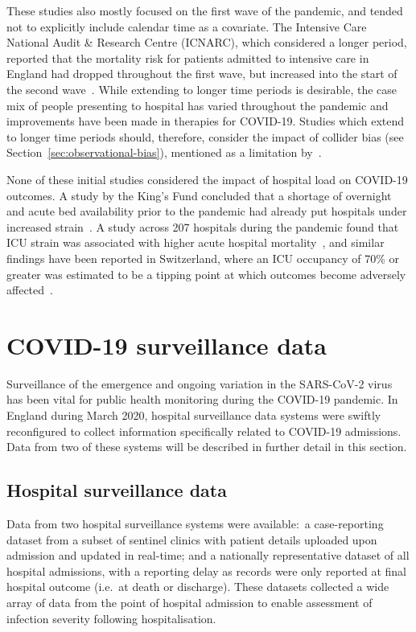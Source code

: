 These studies also mostly focused on the first wave of the pandemic, and tended not to explicitly include calendar time as a covariate. The Intensive Care National Audit \& Research Centre (ICNARC), which considered a longer period, reported that the mortality risk for patients admitted to intensive care in England had dropped throughout the first wave, but increased into the start of the second wave~\parencite{Intensive-Care-National-Audit-and-Research-Centre2021-vs}. While extending to longer time periods is desirable, the case mix of people presenting to hospital has varied throughout the pandemic and improvements have been made in therapies for COVID-19. Studies which extend to longer time periods should, therefore, consider the impact of collider bias (see Section~\ref{sec:observational-bias}), mentioned as a limitation by~\cite{Gray2021-xk}.

None of these initial studies considered the impact of hospital load on COVID-19 outcomes. A study by the King’s Fund concluded that a shortage of overnight and acute bed availability prior to the pandemic had already put hospitals under increased strain~\parencite{Ewbank2021-hi}. A study across 207 hospitals during the pandemic found that ICU strain was associated with higher acute hospital mortality~\parencite{Wilcox2022-yr}, and similar findings have been reported in Switzerland, where an ICU occupancy of 70\% or greater was estimated to be a tipping point at which outcomes become adversely affected~\parencite{Anderegg2022-tq}.

\section{COVID-19 surveillance data}\label{sec:covid-hosp-data}

Surveillance of the emergence and ongoing variation in the SARS-CoV-2 virus has been vital for public health monitoring during the COVID-19 pandemic. In England during March 2020, hospital surveillance data systems were swiftly reconfigured to collect information specifically related to COVID-19 admissions. Data from two of these systems will be described in further detail in this section.

\subsection{Hospital surveillance data}

Data from two hospital surveillance systems were available:\ a case-reporting dataset from a subset of sentinel clinics with patient details uploaded upon admission and updated in real-time; and a nationally representative dataset of all hospital admissions, with a reporting delay as records were only reported at final hospital outcome (i.e.\ at death or discharge). These datasets collected a wide array of data from the point of hospital admission to enable assessment of infection severity following hospitalisation.

